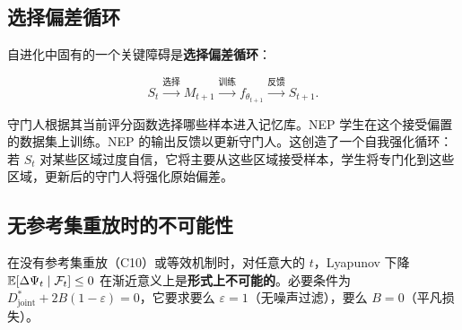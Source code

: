 \subsection{选择偏差循环}

自进化中固有的一个关键障碍是\textbf{选择偏差循环}：

\begin{equation}
    S_t \xrightarrow{\text{选择}} M_{t+1} \xrightarrow{\text{训练}} f_{\theta_{t+1}} \xrightarrow{\text{反馈}} S_{t+1}.
\end{equation}

守门人根据其当前评分函数选择哪些样本进入记忆库。NEP 学生在这个接受偏置的数据集上训练。NEP 的输出反馈以更新守门人。这创造了一个自我强化循环：若 $S_t$ 对某些区域过度自信，它将主要从这些区域接受样本，学生将专门化到这些区域，更新后的守门人将强化原始偏差。

\subsection{无参考集重放时的不可能性}

\begin{theorem}\label{thm:impossible}
在没有参考集重放（C10）或等效机制时，对任意大的 $t$，Lyapunov 下降 $\mathbb{E}[\Delta\Psi_t \mid \mathcal{F}_t] \leq 0$ 在渐近意义上是\textbf{形式上不可能的}。必要条件为 $D_{\text{joint}}^* + 2B(1-\varepsilon) = 0$，它要求要么 $\varepsilon = 1$（无噪声过滤），要么 $B = 0$（平凡损失）。
\end{theorem}


